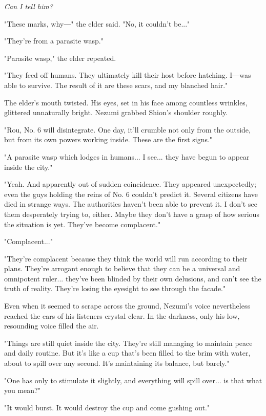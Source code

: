 \emph{Can I tell him?}

"These marks, why―" the elder said. "No, it couldn't be..."

"They're from a parasite wasp."

"Parasite wasp," the elder repeated.

"They feed off humans. They ultimately kill their host before hatching.
I―was able to survive. The result of it are these scars, and my blanched
hair."

The elder's mouth twisted. His eyes, set in his face among countless
wrinkles, glittered unnaturally bright. Nezumi grabbed Shion's shoulder
roughly.

"Rou, No. 6 will disintegrate. One day, it'll crumble not only from the
outside, but from its own powers working inside. These are the first
signs."

"A parasite wasp which lodges in humans... I see... they have begun to
appear inside the city."

"Yeah. And apparently out of sudden coincidence. They appeared
unexpectedly; even the guys holding the reins of No. 6 couldn't predict
it. Several citizens have died in strange ways. The authorities haven't
been able to prevent it. I don't see them desperately trying to, either.
Maybe they don't have a grasp of how serious the situation is yet.
They've become complacent."

"Complacent..."

"They're complacent because they think the world will run according to
their plans. They're arrogant enough to believe that they can be a
universal and omnipotent ruler... they've been blinded by their own
delusions, and can't see the truth of reality. They're losing the
eyesight to see through the facade."

Even when it seemed to scrape across the ground, Nezumi's voice
nevertheless reached the ears of his listeners crystal clear. In the
darkness, only his low, resounding voice filled the air.

"Things are still quiet inside the city. They're still managing to
maintain peace and daily routine. But it's like a cup that's been filled
to the brim with water, about to spill over any second. It's maintaining
its balance, but barely."

"One has only to stimulate it slightly, and everything will spill
over... is that what you mean?"

"It would burst. It would destroy the cup and come gushing out."

